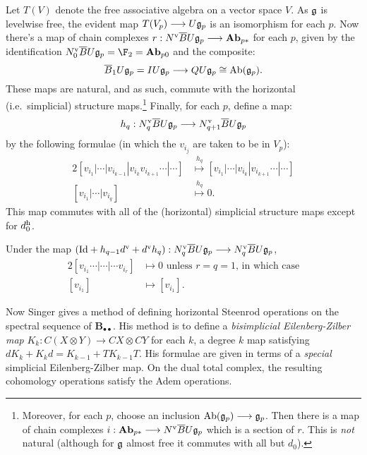 \documentclass[10pt]{article}
\begin{document}
\begin{Lie Steenrods satisfy the Adem relation}
Let $T(V)$ denote the free associative algebra on a vector space $V$. As $\mathfrak{g}$ is levelwise free, the evident map $T(V_p)\longrightarrow U\mathfrak{g}_p$ is an isomorphism for each $p$. Now there's a map of chain complexes $r:N^\textup{v}\overline{B}U\mathfrak{g}_p\longrightarrow \textbf{Ab}_{p*}$ for each $p$, given by the identification $N^\textup{v}_0\overline{B}U\frakg_p=\F_2=\textbf{Ab}_{p0}$ and the composite:
\[\overline{B}_1U\mathfrak{g}_p=IU\mathfrak{g}_p\longrightarrow QU\mathfrak{g}_p\cong \textup{Ab}(\mathfrak{g}_p).\]
These maps are natural, and as such, commute with the horizontal (i.e.\ simplicial) structure maps.\footnote{Moreover, for each $p$, choose an inclusion $\textup{Ab}(\mathfrak{g}_p)\longrightarrow \mathfrak{g}_p$. Then there is a map of chain complexes $i:\textbf{Ab}_{p*}\longrightarrow N^\textup{v}\overline{B}U\mathfrak{g}_p$ which is a section of $r$. This is \emph{not} natural (although for $\mathfrak{g}$ almost free it commutes with all but $d_0$).} Finally, for each $p$, define a map:
\[h_q:{N^\textup{v}_q\overline{B}U\mathfrak{g}_p}\longrightarrow {N^\textup{v}_{q+1}\overline{B}U\mathfrak{g}_p}\]
by the following formulae (in which the $v_{i_{j}}$ are taken to be in $V_p$):
\begin{alignat*}{2}
[v_{i_1}|\cdots |v_{i_{k-1}}|v_{i_{k}}v_{i_{k+1}}\cdots |\cdots ]
&\overset{h_q}{\mapsto}
[v_{i_1}|\cdots |v_{i_{k}}|v_{i_{k+1}}\cdots |\cdots ]%
\\
[v_{i_1}|\cdots |v_{i_{q}}]
&\overset{h_q}{\mapsto}0.
\end{alignat*}
This map commutes with all of the (horizontal) simplicial structure maps except for $d^\textup{h}_0$.
\begin{lem}\label{barConstNullHtpyLemma}
Under the map $(\textup{Id}+h_{q-1}d^\textup{v}+d^\textup{v}h_{q}): N^\textup{v}_q\overline{B}U\mathfrak{g}_p\longrightarrow N^\textup{v}_q\overline{B}U\mathfrak{g}_p$,
\begin{alignat*}{2}
[v_{i_1}\cdots |\cdots |\cdots v_{i_r}]
&\mapsto0\text{ unless $r=q=1$, in which case}%
\\
[v_{i_1}]
&\mapsto [v_{i_{1}}].
\end{alignat*}
\end{lem}
Now Singer \cite{SingerSteen1.pdf} gives a method of defining horizontal Steenrod operations on the spectral sequence of $\textbf{B}_{\bullet\bullet}$. His method is to define a \emph{bisimplicial Eilenberg-Zilber map} $K_k:C\left(X\otimes Y\right)\to CX\otimes CY$ for each $k$, a degree $k$ map satisfying $dK_k+K_kd=K_{k-1}+TK_{k-1}T$. His formulae are given in terms of a \emph{special} simplicial Eilenberg-Zilber map. On the dual total complex, the resulting cohomology operations satisfy the Adem operations.


\end{Lie Steenrods satisfy the Adem relation}
\end{document}
